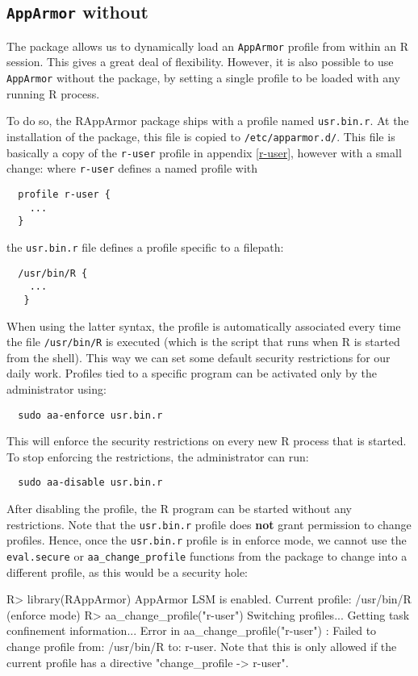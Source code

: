 \documentclass{jss}
\newcommand{\R}{\textsf{R}\xspace}
\newcommand{\AppArmor}{\texttt{AppArmor}\xspace}
\newcommand{\RAppArmor}{\pkg{RAppArmor}\xspace}
\begin{document}
\subsection[AppArmor without RAppArmor]{\AppArmor without \RAppArmor}
\label{usr.bin.r}

The \RAppArmor package allows us to dynamically load an \AppArmor profile from
within an \R session. This gives a great deal of flexibility. However, it is
also possible to use \AppArmor without the \RAppArmor package, by setting a
single profile to be loaded with any running \R process.

To do so, the RAppArmor package ships with a profile named \texttt{usr.bin.r}.
At the installation of the package, this file is copied to
\texttt{/etc/apparmor.d/}. This file is basically a copy of the \texttt{r-user}
profile in appendix \ref{r-user}, however with a small change: where
\texttt{r-user} defines a named profile with
\begin{verbatim}
  profile r-user {
    ...
  }
\end{verbatim}
the \texttt{usr.bin.r} file defines a profile specific to a filepath:
\begin{verbatim}
  /usr/bin/R {
    ...
   }
\end{verbatim}

When using the latter syntax, the profile is automatically associated every
time the file \texttt{/usr/bin/R} is executed (which is the script that runs
when \R is started from the shell). This way we can set some default security
restrictions for our daily work. Profiles tied to a specific program can be
activated only by the administrator using:
\begin{verbatim}
  sudo aa-enforce usr.bin.r
\end{verbatim}
This will enforce the security restrictions on every new \R process that is
started. To stop enforcing the restrictions, the administrator can run:
\begin{verbatim}
  sudo aa-disable usr.bin.r
\end{verbatim}
After disabling the profile, the \R program can be started without any
restrictions.
Note that the \texttt{usr.bin.r} profile does \textbf{not} grant permission to
change profiles. Hence, once the \texttt{usr.bin.r} profile is in enforce mode,
we cannot use the \texttt{eval.secure} or \texttt{aa\_change\_profile} functions
from the \RAppArmor package to change into a different profile, as this
would be a security hole:

\begin{CodeChunk}
\begin{CodeInput}
R> library(RAppArmor)
AppArmor LSM is enabled.
Current profile: /usr/bin/R (enforce mode)
R> aa_change_profile("r-user")
Switching profiles...
Getting task confinement information...
Error in aa_change_profile("r-user") : 
  Failed to change profile from: /usr/bin/R to: r-user.
  Note that this is only allowed if the current profile has a
  directive "change_profile -> r-user".
\end{CodeInput}
\end{CodeChunk}
\end{document}

